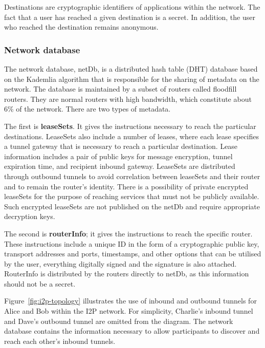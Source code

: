 Destinations are cryptographic identifiers of applications within the network. The fact that a user has reached a given destination is a secret. In addition, the user who reached the destination remains anonymous.

\subsubsection{Network database}
The network database, netDb, is a distributed hash table (DHT) database based on the Kademlia algorithm that is responsible for the sharing of metadata on the network. The database is maintained by a subset of routers called floodfill routers. They are normal routers with high bandwidth, which constitute about 6\% of the network. There are two types of metadata. 

The first is \textbf{leaseSets}. It gives the instructions necessary to reach the particular destinations. LeaseSets also include a number of leases, where each lease specifies a tunnel gateway that is necessary to reach a particular destination. Lease information includes a pair of public keys for message encryption, tunnel expiration time, and recipient inbound gateway. LeaseSets are distributed through outbound tunnels to avoid correlation between leaseSets and their router and to remain the router’s identity. There is a possibility of private encrypted leaseSets for the purpose of reaching services that must not be publicly available. Such encrypted leaseSets are not published on the netDb and require appropriate decryption keys.

The second is \textbf{routerInfo}; it gives the instructions to reach the specific router. These instructions include a unique ID in the form of a cryptographic public key,  transport addresses and ports, timestamps, and other options that can be utilised by the user, everything digitally signed and the signature is also attached. RouterInfo is distributed by the routers directly to netDb, as this information should not be a secret.

Figure~\ref{fig:i2p-topology} illustrates the use of inbound and outbound tunnels for Alice and Bob within the I2P network. For simplicity, Charlie's inbound tunnel and Dave's outbound tunnel are omitted from the diagram. The network database contains the information necessary to allow participants to discover and reach each other's inbound tunnels.

